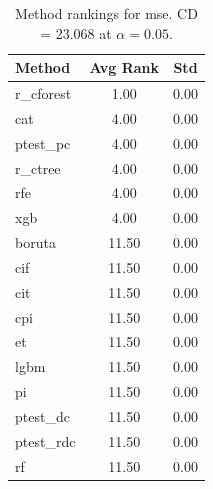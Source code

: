 \begin{table}[h]
\centering
\caption{Method rankings for mse. CD = 23.068 at $\alpha=0.05$.}
\label{tab:ranks_mse}
\begin{tabular}{lcc}
\toprule
Method & Avg Rank & Std \\
\midrule
r_cforest & 1.00 & 0.00 \\
cat & 4.00 & 0.00 \\
ptest_pc & 4.00 & 0.00 \\
r_ctree & 4.00 & 0.00 \\
rfe & 4.00 & 0.00 \\
xgb & 4.00 & 0.00 \\
boruta & 11.50 & 0.00 \\
cif & 11.50 & 0.00 \\
cit & 11.50 & 0.00 \\
cpi & 11.50 & 0.00 \\
et & 11.50 & 0.00 \\
lgbm & 11.50 & 0.00 \\
pi & 11.50 & 0.00 \\
ptest_dc & 11.50 & 0.00 \\
ptest_rdc & 11.50 & 0.00 \\
rf & 11.50 & 0.00 \\
\bottomrule
\end{tabular}
\end{table}